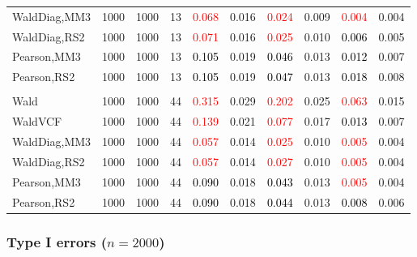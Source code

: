 \documentclass[
]{article}
\begin{document}
\begin{table}[H]
{\begin{tabular}[t]{lrrrrrrlrr}
\hspace{1em}WaldDiag,MM3 & 1000 & 1000 & 13 & \textcolor{red}{0.068} & 0.016 & \textcolor{red}{0.024} & 0.009 & \textcolor{red}{0.004} & 0.004\\
\hspace{1em}WaldDiag,RS2 & 1000 & 1000 & 13 & \textcolor{red}{0.071} & 0.016 & \textcolor{red}{0.025} & 0.010 & \textcolor{black}{0.006} & 0.005\\
\hspace{1em}Pearson,MM3 & 1000 & 1000 & 13 & \textcolor{black}{0.105} & 0.019 & \textcolor{black}{0.046} & 0.013 & \textcolor{black}{0.012} & 0.007\\
\hspace{1em}Pearson,RS2 & 1000 & 1000 & 13 & \textcolor{black}{0.105} & 0.019 & \textcolor{black}{0.047} & 0.013 & \textcolor{black}{0.018} & 0.008\\
\addlinespace[0.3em]
\multicolumn{10}{l}{\textbf{3F 15V}}\\
\hspace{1em}Wald & 1000 & 1000 & 44 & \textcolor{red}{0.315} & 0.029 & \textcolor{red}{0.202} & 0.025 & \textcolor{red}{0.063} & 0.015\\
\hspace{1em}WaldVCF & 1000 & 1000 & 44 & \textcolor{red}{0.139} & 0.021 & \textcolor{red}{0.077} & 0.017 & \textcolor{black}{0.013} & 0.007\\
\hspace{1em}WaldDiag,MM3 & 1000 & 1000 & 44 & \textcolor{red}{0.057} & 0.014 & \textcolor{red}{0.025} & 0.010 & \textcolor{red}{0.005} & 0.004\\
\hspace{1em}WaldDiag,RS2 & 1000 & 1000 & 44 & \textcolor{red}{0.057} & 0.014 & \textcolor{red}{0.027} & 0.010 & \textcolor{red}{0.005} & 0.004\\
\hspace{1em}Pearson,MM3 & 1000 & 1000 & 44 & \textcolor{black}{0.090} & 0.018 & \textcolor{black}{0.043} & 0.013 & \textcolor{red}{0.005} & 0.004\\
\hspace{1em}Pearson,RS2 & 1000 & 1000 & 44 & \textcolor{black}{0.090} & 0.018 & \textcolor{black}{0.044} & 0.013 & \textcolor{black}{0.008} & 0.006\\
\bottomrule
\end{tabular}}
\endgroup{}
\end{table}

\hypertarget{type-i-errors-n2000-2}{%
\subsubsection{\texorpdfstring{Type I errors
(\(n=2000\))}{Type I errors (n=2000)}}\label{type-i-errors-n2000-2}}
\end{document}
